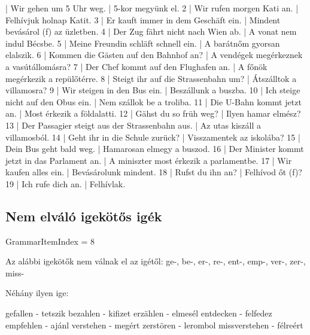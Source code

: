 \documentclass{article}
\newenvironment{desc}{\verbatim}{\endverbatim}
\newenvironment{exmp}{\verbatim}{\endverbatim}
\begin{document}
\begin{exmp}
1 | Wir gehen um 5 Uhr weg. | 5-kor megyünk el.
2 | Wir rufen morgen Kati an. | Felhívjuk holnap Katit.
3 | Er kauft immer in dem Geschäft ein. | Mindent bevásárol (f) az üzletben.
4 | Der Zug fährt nicht nach Wien ab. | A  vonat nem indul Bécsbe.
5 | Meine Freundin schläft schnell ein. | A barátnőm gyorsan elalszik.
6 | Kommen die Gästen auf den Bahnhof an? | A vendégek megérkeznek a vasútállomásra?
7 | Der Chef kommt auf den Flughafen an. | A főnök megérkezik a repülőtérre.
8 | Steigt ihr auf die Strassenbahn um? | Átszálltok a villamosra?
9 | Wir steigen in den Bus ein. | Beszállunk a buszba.
10 | Ich steige nicht auf den Obus ein. | Nem szállok be a troliba.
11 | Die U-Bahn kommt jetzt an. | Most érkezik a földalatti.
12 | Gähst du so früh weg? | Ilyen hamar elmész?
13 | Der Passagier steigt aus der Strassenbahn aus. | Az utas kiszáll a villamosból.
14 | Geht ihr in die Schule zurück? | Visszamentek az iskolába?
15 | Dein Bus geht bald weg. | Hamarosan elmegy a buszod.
16 | Der Minister kommt jetzt in das Parlament an. | A miniszter most érkezik a parlamentbe.
17 | Wir kaufen alles ein. | Bevásárolunk mindent.
18 | Rufst du ihn an? | Felhívod őt (f)?
19 | Ich rufe dich an. | Felhívlak.
\end{exmp}

\subsection{Nem elváló igekötős igék}

GrammarItemIndex = 8

\begin{desc}
Az alábbi igekötők nem válnak el az igétől:
ge-, be-, er-, re-, ent-, emp-, ver-, zer-, miss-

Néhány ilyen ige:

gefallen - tetszik
bezahlen - kifizet
erzählen - elmesél
entdecken - felfedez
empfehlen - ajánl
verstehen - megért
zerstören - lerombol
missverstehen - félreért

\end{desc}
\end{document}
